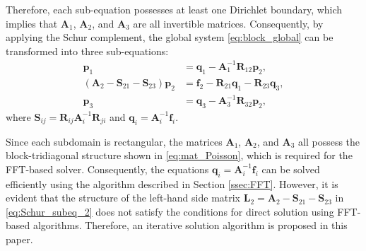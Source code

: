 \documentclass[preprint]{elsarticle}
\begin{document}
Therefore, each sub-equation possesses at least one Dirichlet boundary, which implies that $\boldsymbol{A}_1$, $\boldsymbol{A}_2$, and $\boldsymbol{A}_3$ are all invertible matrices. Consequently, by applying the Schur complement, the global system \eqref{eq:block_global} can be transformed into three sub-equations:
\begin{subequations}
    \label{eq:Schur_subeq}
    \begin{align}
        \boldsymbol{p}_{1}&=\boldsymbol{q}_{1}-\boldsymbol{A}_{1}^{-1}\boldsymbol{R}_{12}\boldsymbol{p}_{2},\label{eq:Schur_subeq_1}\\
        \left(\boldsymbol{A}_{2}-\boldsymbol{S}_{21}-\boldsymbol{S}_{23}\right)\boldsymbol{p}_{2}&=\boldsymbol{f}_{2}-\boldsymbol{R}_{21}\boldsymbol{q}_{1}-\boldsymbol{R}_{23}\boldsymbol{q}_{3},\label{eq:Schur_subeq_2}\\
        \boldsymbol{p}_{3}&=\boldsymbol{q}_{3}-\boldsymbol{A}_{3}^{-1}\boldsymbol{R}_{32}\boldsymbol{p}_{2},\label{eq:Schur_subeq_3}
    \end{align}
\end{subequations}
where $\boldsymbol{S}_{ij}=\boldsymbol{R}_{ij}\boldsymbol{A}_{i}^{-1}\boldsymbol{R}_{ji}$ and $\boldsymbol{q}_{i}=\boldsymbol{A}_{i}^{-1}\boldsymbol{f}_{i}$.
 
Since each subdomain is rectangular, the matrices $\boldsymbol{A}_1$, $\boldsymbol{A}_2$, and $\boldsymbol{A}_3$ all possess the block-tridiagonal structure shown in \eqref{eq:mat_Poisson}, which is required for the FFT-based solver. Consequently, the equations $\boldsymbol{q}_{i}=\boldsymbol{A}_{i}^{-1}\boldsymbol{f}_{i}$ can be solved efficiently using the algorithm described in Section \ref{ssec:FFT}. However, it is evident that the structure of the left-hand side matrix $\boldsymbol{L}_{2}=\boldsymbol{A}_{2}-\boldsymbol{S}_{21}-\boldsymbol{S}_{23}$ in \eqref{eq:Schur_subeq_2} does not satisfy the conditions for direct solution using FFT-based algorithms. Therefore, an iterative solution algorithm is proposed in this paper.
\end{document}
